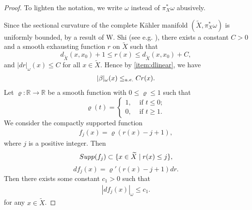 \documentclass[11pt,a4paper,english]{smfart}
\theoremstyle{plain}
\theoremstyle{definition}
\theoremstyle{plain}
\def\ddc{{dd^{\mathrm{c}}}}
\begin{document}
	\begin{proof}
  To lighten the notation, we write  $\omega$   instead of   $\pi_X^*\omega$ abusively.  
   
Since the sectional curvature of the complete K\"ahler manifold $(\widetilde{X},\pi_X^*\omega)$ is uniformly bounded,  by a result of W. Shi (see e.g. \cite[Theorem 1.2]{Hua19}),  there exists a constant $C>0$ and a  smooth exhausting function $r$   on $\widetilde{X}$ such that 
$$
d_{\widetilde{X}}(x,x_0)+1 \leq r(x)\leq d_{\widetilde{X}}(x,x_0)+C,
$$ 
and $|d r|_{\omega}(x) \leq C$  for all $x \in \widetilde{X}$.   Hence by \eqref{item:dlinear}, we have 
\begin{align}\label{eq:betanorm}
	 |\beta|_\omega(x)\leq_{\rm a.e.} Cr(x).
\end{align} 	Let $\varrho: \mathbb{R} \rightarrow \mathbb{R}$ be a smooth function with $0 \leq \varrho \leq 1$ such that
		$$
\varrho(t)= \begin{cases}1, & \text { if } t \leq 0; \\ 0, & \text { if } t \geq 1.\end{cases}
		$$
		We consider the compactly supported function
		\begin{align}\label{eq:support}
			f_j(x)=\varrho(r(x)-{j}+1),
		\end{align} 
		where $j$ is a positive integer.  Then  $${\rm Supp}(f_j)\subset \{x\in \widetilde{X}\mid   r(x)\leq  {j} \},$$ 
		$$
		df_j(x)=\varrho'(r(x)-j+1) dr.
		$$ 
	Then  there exists some constant $c_1>0$ such that 
		\begin{align} \label{eq:uniform}
 |df_j(x)|_{\omega}\leq c_1. 
		\end{align}
		for any $x\in \widetilde{X}$. 
		
	

\end{proof}
\end{document}
